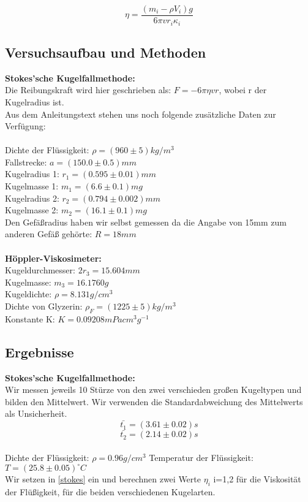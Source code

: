 \documentclass{article}
\begin{document}
\begin{equation}
\eta=\frac{(m_i-\rho V_i)g}{6\pi v r_i \kappa_i}
\end{equation}
\subsection{Versuchsaufbau und Methoden}

\textbf{Stokes'sche Kugelfallmethode:}\\
Die Reibungskraft wird hier geschrieben als:
$F = -6 \pi \eta v r$, wobei r der Kugelradius ist. \\
Aus dem Anleitungstext stehen uns noch folgende zusätzliche Daten zur Verfügung:\\
\\
Dichte der Flüssigkeit: $\rho=(960 \pm 5) kg/m^3$\\
Fallstrecke: $a=(150.0 \pm 0.5)mm$\\
Kugelradius 1: $r_1=(0.595 \pm 0.01)mm$\\
Kugelmasse 1: $m_1=(6.6 \pm 0.1)mg$\\
Kugelradius 2: $r_2=(0.794 \pm 0.002)mm$\\
Kugelmasse 2: $m_2=(16.1 \pm 0.1)mg$\\
Den Gefäßradius haben wir selbst gemessen da die Angabe von 15mm zum anderen Gefäß gehörte: $R=18mm$\\ 
\\
\textbf{Höppler-Viskosimeter:}\\
Kugeldurchmesser: $2r_3=15.604mm$\\
Kugelmasse: $m_3=16.1760g$\\
Kugeldichte: $\rho=8.131 g/cm^3$\\
Dichte von Glyzerin: $\rho_F=(1225 \pm 5)kg/m^3$\\
Konstante K: $K=0.09208mPa cm^3 g^{-1}$\\

\subsection{Ergebnisse}
\textbf{Stokes'sche Kugelfallmethode:}\\
Wir messen jeweils 10 Stürze von den zwei verschieden großen Kugeltypen und bilden den Mittelwert. Wir verwenden die Standardabweichung des Mittelwerts als Unsicherheit.
$$\bar{t_1}=(3.61\pm0.02)s$$
$$\bar{t_2}=(2.14\pm0.02)s$$
\\
Dichte der Flüssigkeit: $\rho=0.96 g/cm^3$
Temperatur der Flüssigkeit: $T=(25.8 \pm 0.05)^\circ C$
\\
Wir setzen in \ref{stokes} ein und berechnen zwei Werte $\eta_i$ i=1,2 für die Viskosität der Flüßigkeit, für die beiden verschiedenen Kugelarten. \\
\end{document}
